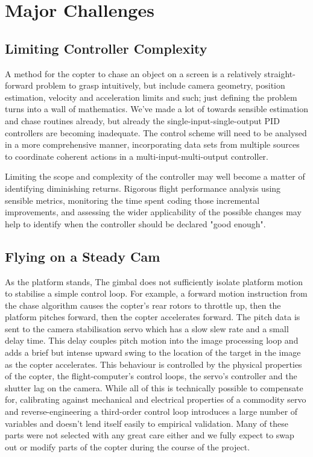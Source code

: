 \documentclass[11pt]{article}
\begin{document}
  \section{Major Challenges}
    \subsection{Limiting Controller Complexity}
      A method for the copter to chase an object on a screen is a relatively straight-forward problem to grasp intuitively, but include camera geometry, position estimation, velocity and acceleration limits and such; just defining the problem turns into a wall of mathematics.  We've made a lot of towards sensible estimation and chase routines already, but already the single-input-single-output PID controllers are becoming inadequate. The control scheme will need to be analysed in a more comprehensive manner, incorporating data sets from multiple sources to coordinate coherent actions in a multi-input-multi-output controller.

      Limiting the scope and complexity of the controller may well become a matter of identifying diminishing returns.  Rigorous flight performance analysis using sensible metrics, monitoring the time spent coding those incremental improvements, and assessing the wider applicability of the possible changes may help to identify when the controller should be declared "good enough".


    \subsection{Flying on a Steady Cam}
    \label{sec:Camera Stability}
      As the platform stands, The gimbal does not sufficiently isolate platform motion to stabilise a simple control loop.
      For example, a forward motion instruction from the chase algorithm causes the copter's rear rotors to throttle up, then the platform pitches forward, then the copter accelerates forward.  The pitch data is sent to the camera stabilisation servo which has a slow slew rate and a small delay time.  This delay couples pitch motion into the image processing loop and adds a brief but intense upward swing to the location of the target in the image as the copter accelerates.
      This behaviour is controlled by the physical properties of the copter, the flight-computer's control loops, the servo's controller and the shutter lag on the camera. While all of this is technically possible to compensate for, calibrating against mechanical and electrical properties of a commodity servo and reverse-engineering a third-order control loop introduces a large number of variables and doesn't lend itself easily to empirical validation.  Many of these parts were not selected with any great care either and we fully expect to swap out or modify parts of the copter during the course of the project.
\end{document}

